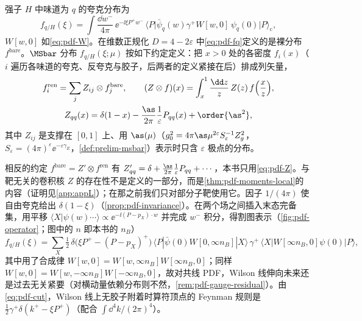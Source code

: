 \begin{definition}[夸克分布]\label{def:pdf-quark}
强子 $H$ 中味道为 $q$ 的夸克分布为
\begin{equation}\label{eq:pdf-fq}
f_{q/H}(\xi)=\int\frac{\dd w^-}{4\pi}\,\ee^{-\ii\xi P^+w^-}\,\big\langle P\big|\bar\psi_q(w)\gamma^+W[w,0]\,\psi_q(0)\big|P\big\rangle_{\mathrm c},
\end{equation}
$W[w,0]$ 如\cref{eq:pdf-W}。在维数正规化 $D=4-2\varepsilon$ 中\cref{eq:pdf-fq}定义的是裸分布 $f^{\mathrm{bare}}$。$\MSbar$ 分布 $f_{q/H}(\xi;\mu)$ 按如下约定定义：把 $x>0$ 处的各密度 $f_i(x)$（$i$ 遍历各味道的夸克、反夸克与胶子，后两者的定义紧接在后）排成列矢量，
\begin{equation}\label{eq:pdf-Z}
\begin{gathered}
f^{\mathrm{ren}}_i=\sum_jZ_{ij}\otimes f^{\mathrm{bare}}_j,\qquad (Z\otimes f)(x)=\int_x^1\frac{\dd z}{z}\,Z(z)\,f\Big(\frac xz\Big),\\
Z_{qq}(x)=\delta(1-x)-\frac{\as}{2\pi}\frac1\varepsilon P_{qq}(x)+\order{\as^2},
\end{gathered}
\end{equation}
其中 $Z_{ij}$ 是支撑在 $[0,1]$ 上、用 $\as(\mu)$（$g_0^2=4\pi\as\mu^{2\varepsilon}S_\varepsilon^{-1}Z_g^2$，$S_\varepsilon=(4\pi)^\varepsilon\ee^{-\varepsilon\gamma_E}$，\cref{def:prelim-msbar}）表示时只含 $\varepsilon$ 极点的分布。
\end{definition}

相反的约定 $f^{\mathrm{bare}}=Z'\otimes f^{\mathrm{ren}}$ 有 $Z'_{qq}=\delta+\frac{\as}{2\pi}\frac1\varepsilon P_{qq}+\cdots$，本书只用\cref{eq:pdf-Z}。与靶无关的卷积核 $Z$ 的存在性不是定义的一部分，而是\cref{thm:pdf-moments-local}的内容（证明见\cref{app:appL}）；在那之前我们只对部分子靶使用它。因子 $1/(4\pi)$ 使自由夸克给出 $\delta(1-\xi)$（\cref{prop:pdf-invariance}）。在两个场之间插入末态完备集，用平移 $\langle X|\psi(w)\cdots\rangle\propto\ee^{-\ii(P-p_X)\cdot w}$ 并完成 $w^-$ 积分，得割图表示（\cref{fig:pdf-operator}；图中的 $n$ 即本书的 $n_B$）
\begin{equation}\label{eq:pdf-cut}
f_{q/H}(\xi)=\sum_X\tfrac12\,\delta\big(\xi P^+-(P-p_X)^+\big)\,
\langle P|\bar\psi(0)W[0,\infty n_B]|X\rangle\,\gamma^+\,\langle X|W[\infty n_B,0]\psi(0)|P\rangle ,
\end{equation}
其中用了合成律 $W[w,0]=W[w,\infty n_B]W[\infty n_B,0]$；同样 $W[w,0]=W[w,-\infty n_B]W[-\infty n_B,0]$，故对共线 PDF，Wilson 线伸向未来还是过去无关紧要（对横动量依赖分布则不然，\cref{rem:pdf-gauge-residual}）。由\cref{eq:pdf-cut}，Wilson 线上无胶子附着时算符顶点的 Feynman 规则是 $\frac12\gamma^+\delta(k^+-\xi P^+)$（配合 $\int\dd^4k/(2\pi)^4$）。

